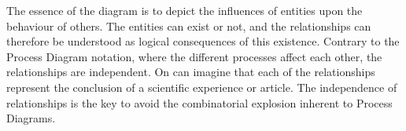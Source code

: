 The essence of the \ER diagram is to depict the influences of entities upon the behaviour of others. The entities can exist or not, and the relationships can therefore be understood as logical consequences of this existence. Contrary to the Process Diagram notation, where the different processes affect each other, the relationships are independent. On can imagine that each of the relationships represent the conclusion of a scientific experience or article. The independence of relationships is the key to avoid the combinatorial explosion inherent to Process Diagrams.

% 
% 
% 
% 
% 
% 

